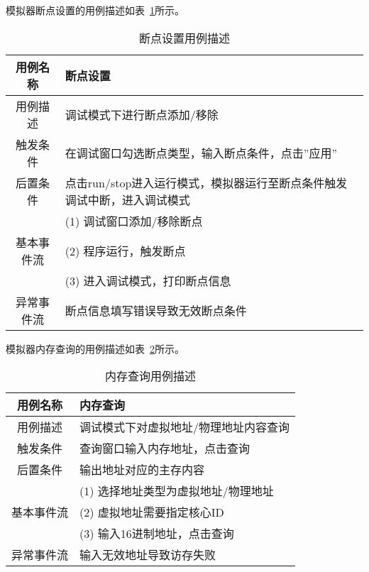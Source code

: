 模拟器断点设置的用例描述如表~\ref{tab:yongli3}所示。
\begin{table}[H]
  \centering
  \caption{断点设置用例描述}
  \label{tab:yongli3}
  \renewcommand\arraystretch{1.1}
  \begin{tabular}{cl}
    \toprule
用例名称	& 断点设置\\
    \midrule
用例描述	& \multicolumn{1}{p{9cm}}{调试模式下进行断点添加/移除}\\ \hline
触发条件	& \multicolumn{1}{m{9cm}}{在调试窗口勾选断点类型，输入断点条件，点击”应用”}\\ \hline
后置条件	& \multicolumn{1}{m{9cm}}{点击run/stop进入运行模式，模拟器运行至断点条件触发调试中断，进入调试模式}\\ \hline
 & \multicolumn{1}{m{9cm}}{(1)	调试窗口添加/移除断点}\\
 基本事件流 & \multicolumn{1}{m{9cm}}{(2)	程序运行，触发断点}\\
 & \multicolumn{1}{m{9cm}}{(3)	进入调试模式，打印断点信息}\\ \hline
异常事件流	& \multicolumn{1}{m{9cm}}{断点信息填写错误导致无效断点条件}\\
    \bottomrule
  \end{tabular}
\end{table}


模拟器内存查询的用例描述如表~\ref{tab:yongli4}所示。
\begin{table}[H]
  \centering
  \caption{内存查询用例描述}
  \label{tab:yongli4}
  \renewcommand\arraystretch{1.1}
  \begin{tabular}{cl}
    \toprule
用例名称	& 内存查询\\
    \midrule
用例描述	& \multicolumn{1}{p{9cm}}{调试模式下对虚拟地址/物理地址内容查询}\\ \hline
触发条件	& \multicolumn{1}{p{9cm}}{查询窗口输入内存地址，点击查询}\\ \hline
后置条件	& \multicolumn{1}{p{9cm}}{输出地址对应的主存内容}\\ \hline
	& \multicolumn{1}{p{9cm}}{(1) 选择地址类型为虚拟地址/物理地址}\\
  基本事件流 &            \multicolumn{1}{p{9cm}}{(2) 虚拟地址需要指定核心ID}\\
 &            \multicolumn{1}{p{9cm}}{(3) 输入16进制地址，点击查询}\\ \hline
异常事件流	& \multicolumn{1}{p{9cm}}{输入无效地址导致访存失败}\\
    \bottomrule
  \end{tabular}
\end{table}


